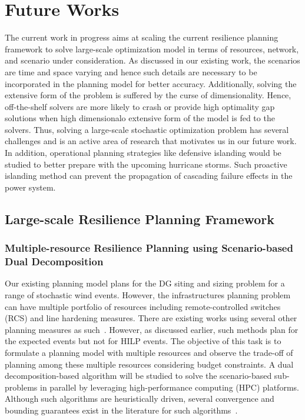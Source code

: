 \clearpage
\section{Future Works}\label{sec:future_Work}
The current work in progress aims at scaling the current resilience planning framework to solve large-scale optimization model in terms of resources, network, and scenario under consideration. As discussed in our existing work, the scenarios are time and space varying and hence such details are necessary to be incorporated in the planning model for better accuracy. Additionally, solving the extensive form of the problem is suffered by the curse of dimensionality. Hence, off-the-shelf solvers are more likely to crash or provide high optimality gap solutions when high dimensionalo extensive form of the model is fed to the solvers. Thus, solving a large-scale stochastic optimization problem has several challenges and is an active area of research that motivates us in our future work. In addition, operational planning strategies like defensive islanding would be studied to better prepare with the upcoming hurricane storms. Such proactive islanding method can prevent the propagation of cascading failure effects in the power system.

\subsection{Large-scale Resilience Planning Framework}
\subsubsection{Multiple-resource Resilience Planning using Scenario-based Dual Decomposition}
Our existing planning model plans for the DG siting and sizing problem for a range of stochastic wind events. However, the infrastructures planning problem can have multiple portfolio of resources including remote-controlled switches (RCS) and line hardening measures. There are existing works using several other planning measures as such~\cite{7514755}. However, as discussed earlier, such methods plan for the expected events but not for HILP events. The objective of this task is to formulate a planning model with multiple resources and observe the trade-off of planning among these multiple resources considering budget constraints. A dual decomposition-based algorithm will be studied to solve the scenario-based sub-problems in parallel by leveraging high-performance computing (HPC) platforms. Although such algorithms are heuristically driven, several convergence  and bounding guarantees exist in the literature for such algorithms~\cite{boland2018combining}.   

